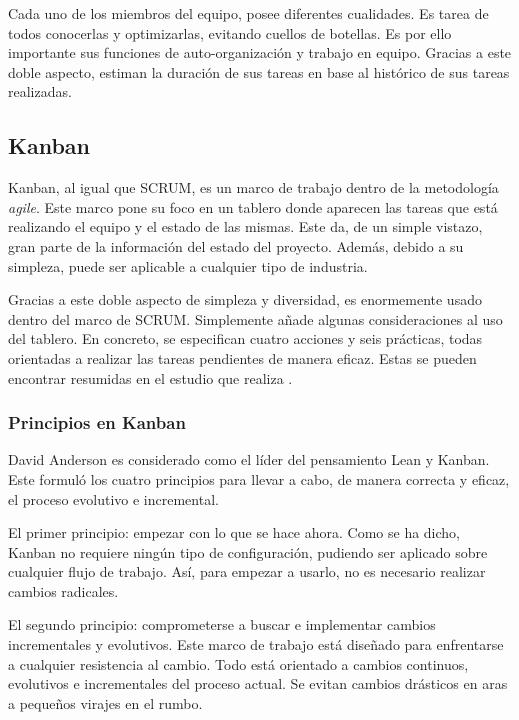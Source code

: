 Cada uno de los miembros del equipo, posee diferentes cualidades. Es tarea de todos conocerlas y optimizarlas, evitando cuellos de botellas. Es por ello importante sus funciones de auto-organización y trabajo en equipo. Gracias a este doble aspecto, estiman la duración de sus tareas en base al histórico de sus tareas realizadas.

\subsection{Kanban}
Kanban, al igual que SCRUM, es un marco de trabajo dentro de la metodología \textit{agile}. Este marco pone su foco en un tablero donde aparecen las tareas que está realizando el equipo y el estado de las mismas. Este da, de un simple vistazo, gran parte de la información del estado del proyecto. Además, debido a su simpleza, puede ser aplicable a cualquier tipo de industria.


Gracias a este doble aspecto de simpleza y diversidad, es enormemente usado dentro del marco de SCRUM. Simplemente añade algunas consideraciones al uso del tablero. En concreto, se especifican cuatro acciones y seis prácticas, todas orientadas a realizar las tareas pendientes de manera eficaz. Estas se pueden encontrar resumidas en el estudio que realiza .

\subsubsection{Principios en Kanban}
David Anderson es considerado como el líder del pensamiento Lean y Kanban. Este formuló los cuatro principios para llevar a cabo, de manera correcta y eficaz, el proceso evolutivo e incremental.

El primer principio: empezar con lo que se hace ahora. Como se ha dicho, Kanban no requiere ningún tipo de configuración, pudiendo ser aplicado sobre cualquier flujo de trabajo. Así, para empezar a usarlo, no es necesario realizar cambios radicales.

El segundo principio: comprometerse a buscar e implementar cambios incrementales y evolutivos. Este marco de trabajo está diseñado para enfrentarse a cualquier resistencia al cambio. Todo está orientado a cambios continuos, evolutivos e incrementales del proceso actual. Se evitan cambios drásticos en aras a pequeños virajes en el rumbo.

